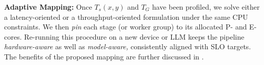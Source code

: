 \noindent\textbf{Adaptive Mapping:}
Once $T_s(x,y)$ and $T_G$ have been profiled, we solve either a latency-oriented or a throughput-oriented formulation under the same CPU constraints. We then \emph{pin} each stage (or worker group) to its allocated P- and E-cores. Re-running this procedure on a new device or LLM keeps the pipeline \emph{hardware-aware} as well as {\em model-aware,} consistently aligned with SLO targets.
The benefits of the proposed mapping are further discussed in . 







